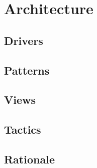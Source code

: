\chapter{Architecture}
\section{Drivers}
\section{Patterns}
\section{Views}
\section{Tactics}
\section{Rationale}


